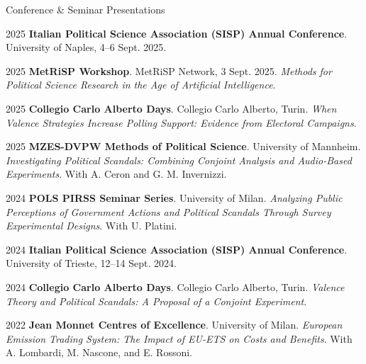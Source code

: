 \documentclass{cv}
\begin{document}
\begin{rSection}{Conference \& Seminar Presentations}
\begin{presentationEntry}{2025}
{\textbf{Italian Political Science Association (SISP) Annual Conference}. University of Naples, 4--6 Sept. 2025.}
\end{presentationEntry}

\begin{presentationEntry}{2025}
{\textbf{MetRiSP Workshop}. MetRiSP Network, 3 Sept. 2025. \textit{Methods for Political Science Research in the Age of Artificial Intelligence}.}
\end{presentationEntry}

\begin{presentationEntry}{2025}
{\textbf{Collegio Carlo Alberto Days}. Collegio Carlo Alberto, Turin. \textit{When Valence Strategies Increase Polling Support: Evidence from Electoral Campaigns}.}
\end{presentationEntry}

\begin{presentationEntry}{2025}
{\textbf{MZES-DVPW Methods of Political Science}. University of Mannheim. \textit{Investigating Political Scandals: Combining Conjoint Analysis and Audio-Based Experiments}. With A. Ceron and G. M. Invernizzi.}
\end{presentationEntry}

\begin{presentationEntry}{2024}
{\textbf{POLS PIRSS Seminar Series}. University of Milan. \textit{Analyzing Public Perceptions of Government Actions and Political Scandals Through Survey Experimental Designs}. With U. Platini.}
\end{presentationEntry}

\begin{presentationEntry}{2024}
{\textbf{Italian Political Science Association (SISP) Annual Conference}. University of Trieste, 12--14 Sept. 2024.}
\end{presentationEntry}

\begin{presentationEntry}{2024}
{\textbf{Collegio Carlo Alberto Days}. Collegio Carlo Alberto, Turin. \textit{Valence Theory and Political Scandals: A Proposal of a Conjoint Experiment}.}
\end{presentationEntry}

\begin{presentationEntry}{2022}
{\textbf{Jean Monnet Centres of Excellence}. University of Milan. \textit{European Emission Trading System: The Impact of EU-ETS on Costs and Benefits}. With A. Lombardi, M. Nascone, and E. Rossoni.}
\end{presentationEntry}

\end{rSection}
\end{document}
